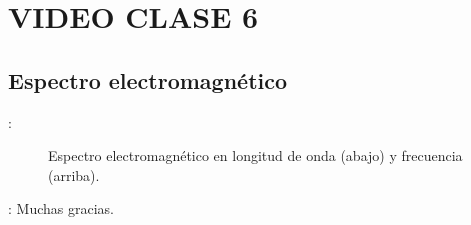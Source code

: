 \section{VIDEO CLASE 6}
\subsection{Espectro electromagnético}
\begin{frame}{\secname : \subsecname}
  \begin{figure}
    \centering
    \caption{Espectro electromagnético en longitud de onda (abajo) y frecuencia (arriba).}
    \label{}
  \end{figure}
\end{frame}


\begin{frame}{\secname : \subsecname}
Muchas gracias.
\end{frame}
